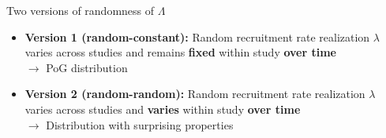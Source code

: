 \documentclass[english]{beamer}\usepackage[]{graphicx}\usepackage[]{xcolor}
\begin{document}
% 





\begin{frame}{Two versions of randomness of $\Lambda$}
\begin{itemize}[label = ]
\item \textbf{Version 1 (random-constant):} Random recruitment rate realization $\lambda$ varies across studies and remains \textbf{fixed} within study \textbf{over time} \\ $\rightarrow$ PoG distribution
\item \textbf{Version 2 (random-random):} Random recruitment rate realization $\lambda$ varies across studies and \textbf{varies} within study \textbf{over time} \\ $\rightarrow$ Distribution with surprising properties
\end{itemize}
\end{frame}
\end{document}
